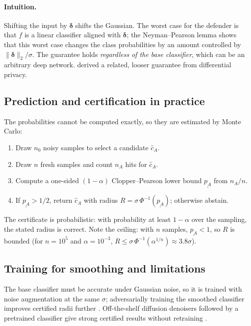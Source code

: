 \documentclass[10pt,a4paper]{extarticle}
\theoremstyle{definition}
\newcommand{\bdelta}{\boldsymbol{\delta}}
\begin{document}
\paragraph{Intuition.} Shifting the input by \(\bdelta\) shifts the Gaussian. The worst case for the defender is that \(f\) is a linear classifier aligned with \(\bdelta\); the Neyman--Pearson lemma shows that this worst case changes the class probabilities by an amount controlled by \(\|\bdelta\|_2/\sigma\). The guarantee holds \emph{regardless of the base classifier}, which can be an arbitrary deep network. \citet{lecuyer2019certified} derived a related, looser guarantee from differential privacy.

\subsection{Prediction and certification in practice}

The probabilities cannot be computed exactly, so they are estimated by Monte Carlo:
\begin{enumerate}
  \item Draw \(n_0\) noisy samples to select a candidate \(\hat c_A\).
  \item Draw \(n\) fresh samples and count \(n_A\) hits for \(\hat c_A\).
  \item Compute a one-sided \((1-\alpha)\) Clopper--Pearson lower bound \(\underline{p_A}\) from \(n_A/n\).
  \item If \(\underline{p_A}>1/2\), return \(\hat c_A\) with radius \(R=\sigma\,\Phi^{-1}(\underline{p_A})\); otherwise abstain.
\end{enumerate}
The certificate is probabilistic: with probability at least \(1-\alpha\) over the sampling, the stated radius is correct. Note the ceiling: with \(n\) samples, \(\underline{p_A}<1\), so \(R\) is bounded (for \(n=10^5\) and \(\alpha=10^{-3}\), \(R\le\sigma\,\Phi^{-1}(\alpha^{1/n})\approx3.8\sigma\)).

\subsection{Training for smoothing and limitations}

The base classifier must be accurate under Gaussian noise, so it is trained with noise augmentation at the same \(\sigma\); adversarially training the smoothed classifier improves certified radii further \citep{salman2019provably}. Off-the-shelf diffusion denoisers followed by a pretrained classifier give strong certified results without retraining \citep{carlini2023certified}.
\end{document}
